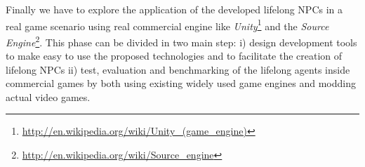\begin{methodologies}
%
\item Finally we have to explore the application of the developed lifelong NPCs in a real game scenario using real commercial engine like \emph{Unity}\footnote{\url{http://en.wikipedia.org/wiki/Unity_(game_engine)}} and the \emph{Source Engine}\footnote{\url{http://en.wikipedia.org/wiki/Source_engine}}. This phase can be divided in two main step: i) design development tools to make easy to use the proposed technologies and to facilitate the creation of lifelong NPCs ii) test, evaluation and benchmarking of the lifelong agents inside commercial games by both using existing widely used game engines and modding actual video games.
\end{methodologies}